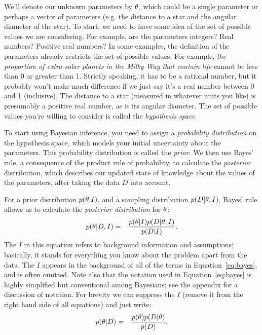 We'll denote our unknown parameters by $\theta$, which could be a single
parameter or perhaps a vector of parameters (e.g. the distance to a star
and the angular diameter of the star). To start, we
need to have some idea of the set of possible values we are considering. For
example, are the parameters integers? Real numbers? Positive real numbers?
In some examples, the definition of the parameters already restricts the set
of possible values. For example, {\it the proportion of extra-solar planets in
the Milky Way that contain life} cannot be less than 0 or greater than 1.
Strictly speaking, it has to be a rational number, but it probably won't make
much difference if we just say it's a real number between 0 and 1 (inclusive).
The distance to a star (measured in whatever units you like) is presumably a
positive real number, as is its angular diameter.
The set of possible values you're willing to consider is called the
{\it hypothesis space}.

To start using Bayesian inference, you need to assign a {\it probability
distribution} on the hypothesis space, which models your initial uncertainty
about the parameters. This probability distribution is called the {\it prior}.
We then use Bayes' rule, a consequence of the product rule of probability,
to calculate the {\it posterior} distribution, which describes our updated
state of knowledge about the values of the parameters, after taking the data
$D$ into account.

For a prior distribution $p(\theta | I)$, and a sampling
distribution $p(D | \theta, I)$, Bayes' rule allows us to calculate
the {\it posterior distribution} for $\theta$:
\begin{eqnarray}
p(\theta | D, I) &=& \frac{p(\theta | I)p(D | \theta, I)}{p(D | I)}.\label{eq:bayes}
\end{eqnarray}
The $I$ in this equation refers to background information and assumptions;
basically, it stands for everything you know about the problem apart from the
data. The $I$ appears in the background of all of the terms in
Equation~\ref{eq:bayes}, and is often omitted. Note also that the notation
used in Equation~\ref{eq:bayes} is highly simplified but conventional among
Bayesians; see the appendix for a discussion of notation. For brevity we can
suppress the $I$ (remove it from the right hand side of all equations) and
just write:
\begin{eqnarray}
p(\theta | D) &=& \frac{p(\theta)p(D | \theta)}{p(D)}.\label{eq:bayes}
\end{eqnarray}



